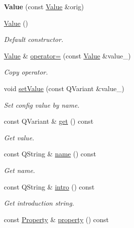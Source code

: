 \begin{DoxyCompactItemize}
{\bfseries Value} (const \mbox{\hyperlink{classeven_1_1_value}{Value}} \&orig)
\item 
\mbox{\label{classeven_1_1_value_abc2a5a2e6484fac66dae2539cc955667}} 
\mbox{\hyperlink{classeven_1_1_value_abc2a5a2e6484fac66dae2539cc955667}{Value}} ()
\begin{DoxyCompactList}\small\item\em Default constructor. \end{DoxyCompactList}\item 
\mbox{\label{classeven_1_1_value_a43fbacb446228784b4cd4572bc7962d1}} 
\mbox{\hyperlink{classeven_1_1_value}{Value}} \& \mbox{\hyperlink{classeven_1_1_value_a43fbacb446228784b4cd4572bc7962d1}{operator=}} (const \mbox{\hyperlink{classeven_1_1_value}{Value}} \&value\+\_\+)
\begin{DoxyCompactList}\small\item\em Copy operator. \end{DoxyCompactList}\item 
void \mbox{\hyperlink{classeven_1_1_value_af538617a3d65889d8de19a5854934d35}{set\+Value}} (const Q\+Variant \&value\+\_\+)
\begin{DoxyCompactList}\small\item\em Set config value by name. \end{DoxyCompactList}\item 
const Q\+Variant \& \mbox{\hyperlink{classeven_1_1_value_a5740b0ec0182b7e7d9b89d921f0fbe06}{get}} () const
\begin{DoxyCompactList}\small\item\em Get value. \end{DoxyCompactList}\item 
const Q\+String \& \mbox{\hyperlink{classeven_1_1_value_a0b679578058ff80fb58d8eb5683998c6}{name}} () const
\begin{DoxyCompactList}\small\item\em Get name. \end{DoxyCompactList}\item 
const Q\+String \& \mbox{\hyperlink{classeven_1_1_value_afd14e52481a06d35fb640df8f89207a1}{intro}} () const
\begin{DoxyCompactList}\small\item\em Get introduction string. \end{DoxyCompactList}\item 
const \mbox{\hyperlink{structeven_1_1_value_1_1_property}{Property}} \& \mbox{\hyperlink{classeven_1_1_value_a2306024bbf8484a692575d56feb902e7}{property}} () const

\end{DoxyCompactItemize}
